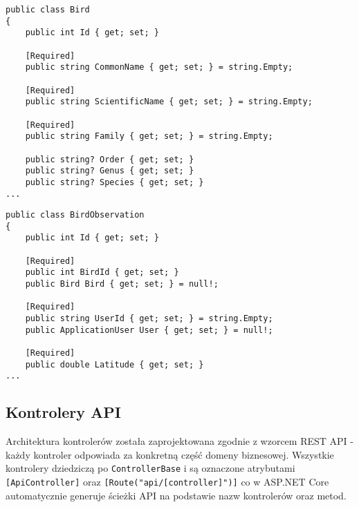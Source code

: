 \begin{lstlisting}[style=csharp, caption={Fragment implementacji Bird}]
public class Bird
{
	public int Id { get; set; }
	
	[Required]
	public string CommonName { get; set; } = string.Empty;
	
	[Required]
	public string ScientificName { get; set; } = string.Empty;
	
	[Required]
	public string Family { get; set; } = string.Empty;
	
	public string? Order { get; set; }
	public string? Genus { get; set; }
	public string? Species { get; set; }
...
\end{lstlisting}

\begin{lstlisting}[style=csharp, caption={Fragment implementacji BirdObservation}]
public class BirdObservation
{
	public int Id { get; set; }
	
	[Required]
	public int BirdId { get; set; }
	public Bird Bird { get; set; } = null!;
	
	[Required]
	public string UserId { get; set; } = string.Empty;
	public ApplicationUser User { get; set; } = null!;
	
	[Required]
	public double Latitude { get; set; }
...
\end{lstlisting}

\subsection{Kontrolery API}

Architektura kontrolerów została zaprojektowana zgodnie z wzorcem REST API - każdy kontroler odpowiada za konkretną część domeny biznesowej. Wszystkie kontrolery dziedziczą po \texttt{ControllerBase} i są oznaczone atrybutami \texttt{[ApiController]} oraz \texttt{[Route("api/[controller]")]} co w ASP.NET Core automatycznie generuje ścieżki API na podstawie nazw kontrolerów oraz metod.

